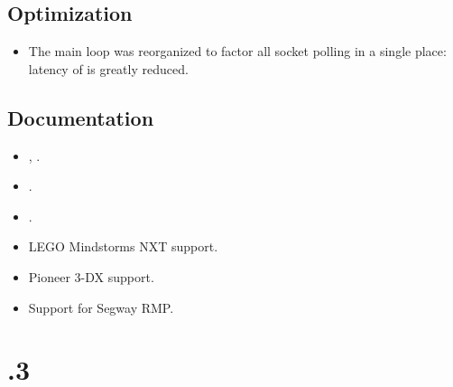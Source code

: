 \subsection{Optimization}
\begin{itemize}
\item The main loop was reorganized to factor all socket polling in a single
  place: latency of  is greatly reduced.
\end{itemize}

\subsection{Documentation}
\begin{itemize}
\item {},  .
\item {}.
\item {}.
\item LEGO Mindstorms NXT support.
\item Pioneer 3-DX support.
\item Support for Segway RMP.
\end{itemize}


\section{.3}

